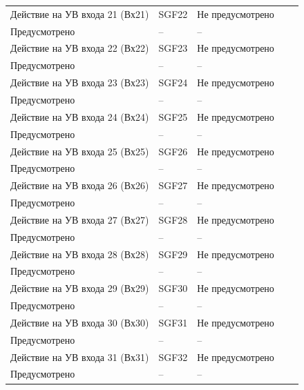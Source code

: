\begin{longtable}{|>{\centering\arraybackslash}m{5.3cm}|>{\centering\arraybackslash}m{3.3cm}|>{\centering\arraybackslash}m{4.2cm}|>{\centering\arraybackslash}m{1.8cm}|>{\centering\arraybackslash}m{1cm}|}
\hline
\centering Действие на УВ входа 21 (Вх21)  & \centering SGF22 & \centering Не предусмотрено \\ Предусмотрено & \centering -- & \centering \arraybackslash -- \\
\hline
\centering Действие на УВ входа 22 (Вх22)  & \centering SGF23 & \centering Не предусмотрено \\ Предусмотрено & \centering -- & \centering \arraybackslash -- \\
\hline
\centering Действие на УВ входа 23 (Вх23)  & \centering SGF24 & \centering Не предусмотрено \\ Предусмотрено & \centering -- & \centering \arraybackslash -- \\
\hline
\centering Действие на УВ входа 24 (Вх24)  & \centering SGF25 & \centering Не предусмотрено \\ Предусмотрено & \centering -- & \centering \arraybackslash -- \\
\hline
\centering Действие на УВ входа 25 (Вх25)  & \centering SGF26 & \centering Не предусмотрено \\ Предусмотрено & \centering -- & \centering \arraybackslash -- \\
\hline
\centering Действие на УВ входа 26 (Вх26)  & \centering SGF27 & \centering Не предусмотрено \\ Предусмотрено & \centering -- & \centering \arraybackslash -- \\
\hline
\centering Действие на УВ входа 27 (Вх27)  & \centering SGF28 & \centering Не предусмотрено \\ Предусмотрено & \centering -- & \centering \arraybackslash -- \\
\hline
\centering Действие на УВ входа 28 (Вх28)  & \centering SGF29 & \centering Не предусмотрено \\ Предусмотрено & \centering -- & \centering \arraybackslash -- \\
\hline
\centering Действие на УВ входа 29 (Вх29)  & \centering SGF30 & \centering Не предусмотрено \\ Предусмотрено & \centering -- & \centering \arraybackslash -- \\
\hline
\centering Действие на УВ входа 30 (Вх30)  & \centering SGF31 & \centering Не предусмотрено \\ Предусмотрено & \centering -- & \centering \arraybackslash -- \\
\hline
\centering Действие на УВ входа 31 (Вх31)  & \centering SGF32 & \centering Не предусмотрено \\ Предусмотрено & \centering -- & \centering \arraybackslash -- \\

\end{longtable}
